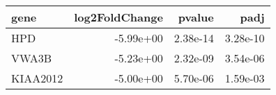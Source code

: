 \begin{tabular}{lrrr}
\toprule
    gene &  log2FoldChange &   pvalue &     padj \\
\midrule
     HPD &       -5.99e+00 & 2.38e-14 & 3.28e-10 \\
   VWA3B &       -5.23e+00 & 2.32e-09 & 3.54e-06 \\
KIAA2012 &       -5.00e+00 & 5.70e-06 & 1.59e-03 \\
\bottomrule
\end{tabular}
